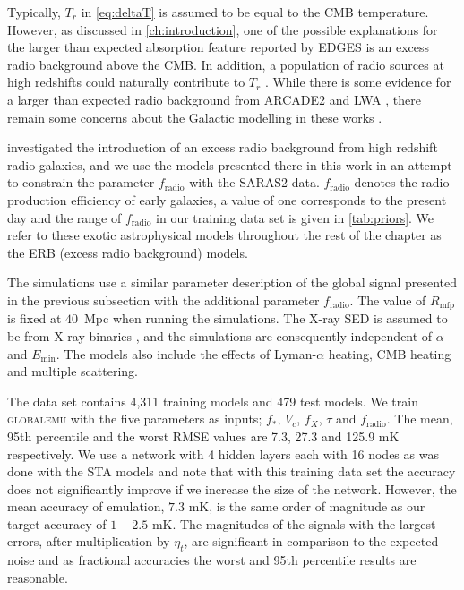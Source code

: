 Typically, $T_r$ in \cref{eq:deltaT} is assumed to be equal to the CMB temperature. However, as discussed in \cref{ch:introduction}, one of the possible explanations for the larger than expected absorption feature reported by EDGES \citep{Bowman_edges_2018} is an excess radio background above the CMB. In addition, a population of radio sources at high redshifts could naturally contribute to $T_r$ \citep[e.g][]{FengRB2018}. While there is some evidence for a larger than expected radio background from ARCADE2 \citep{fixsen_arcade_2011} and LWA \citep{dowell_radio_2018}, there remain some concerns about the Galactic modelling in these works \citep{Subrahmanyan2013}.

\cite{Reis2020} investigated the introduction of an excess radio background from high redshift radio galaxies, and we use the models presented there in this work in an attempt to constrain the parameter $f_\mathrm{radio}$ with the SARAS2 data. $f_\mathrm{radio}$ denotes the radio production efficiency of early galaxies, a value of one corresponds to the present day and the range of $f_\mathrm{radio}$ in our training data set is given in \cref{tab:priors}. We refer to these exotic astrophysical models throughout the rest of the chapter as the ERB (excess radio background) models.

The simulations use a similar parameter description of the global signal presented in the previous subsection with the additional parameter $f_\mathrm{radio}$. The value of $R_\mathrm{mfp}$ is fixed at $40$~Mpc when running the simulations. The X-ray SED is assumed to be from X-ray binaries \citep{fialkov_observable_2014}, and the simulations are consequently independent of $\alpha$ and $E_\mathrm{min}$. The models also include the effects of Lyman-$\alpha$ heating, CMB heating and multiple scattering. 

The data set contains 4,311 training models and 479 test models. We train \textsc{globalemu} with the five parameters as inputs; $f_*$, $V_c$, $f_X$, $\tau$ and $f_\mathrm{radio}$. The mean, 95th percentile and the worst RMSE values are 7.3, 27.3 and 125.9 mK respectively. We use a network with 4 hidden layers each with 16 nodes as was done with the STA models and note that with this training data set the accuracy does not significantly improve if we increase the size of the network. However, the mean accuracy of emulation, $7.3$ mK, is the same order of magnitude as our target accuracy of $1 - 2.5$ mK. The magnitudes of the signals with the largest errors, after multiplication by $\eta_t$, are significant in comparison to the expected noise and as fractional accuracies the worst and 95th percentile results are reasonable.

